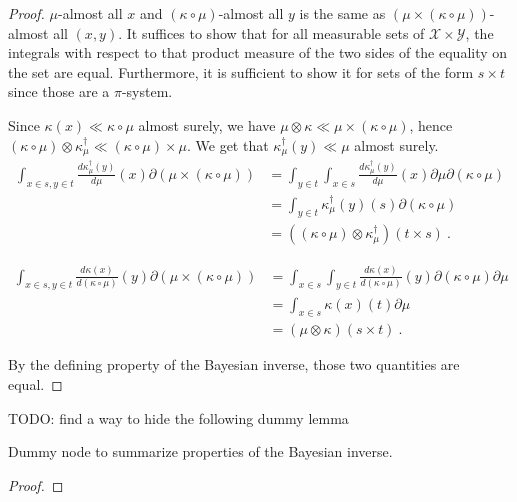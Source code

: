 \begin{proof}%
\uses{}
$\mu$-almost all $x$ and $(\kappa \circ \mu)$-almost all $y$ is the same as $(\mu \times (\kappa \circ \mu))$-almost all $(x, y)$.
It suffices to show that for all measurable sets of $\mathcal X \times \mathcal Y$, the integrals with respect to that product measure of the two sides of the equality on the set are equal. Furthermore, it is sufficient to show it for sets of the form $s \times t$ since those are a $\pi$-system.

Since $\kappa(x) \ll \kappa \circ \mu$ almost surely, we have $\mu \otimes \kappa \ll \mu \times (\kappa \circ \mu)$, hence $(\kappa \circ \mu) \otimes \kappa_\mu^\dagger \ll (\kappa \circ \mu) \times \mu$.
We get that $\kappa_\mu^\dagger(y) \ll \mu$ almost surely.
\begin{align*}
\int_{x \in s, y \in t} \frac{d \kappa_\mu^\dagger(y)}{d \mu}(x) \partial (\mu \times (\kappa \circ \mu))
&= \int_{y \in t} \int_{x \in s} \frac{d \kappa_\mu^\dagger(y)}{d \mu}(x) \partial \mu \partial (\kappa \circ \mu)
\\
&= \int_{y \in t} \kappa_\mu^\dagger(y)(s) \partial (\kappa \circ \mu)
\\
&= ((\kappa \circ \mu) \otimes \kappa_\mu^\dagger) (t \times s)
\: .
\end{align*}

\begin{align*}
\int_{x \in s, y \in t} \frac{d \kappa(x)}{d(\kappa \circ \mu)}(y) \partial (\mu \times (\kappa \circ \mu))
&= \int_{x \in s} \int_{y \in t} \frac{d \kappa(x)}{d(\kappa \circ \mu)}(y) \partial (\kappa \circ \mu) \partial \mu
\\
&= \int_{x \in s} \kappa(x)(t) \partial \mu
\\
&= (\mu \otimes \kappa) (s \times t)
\: .
\end{align*}

By the defining property of the Bayesian inverse, those two quantities are equal.
\end{proof}



TODO: find a way to hide the following dummy lemma
\begin{lemma}
  \label{lem:bayesInv_properties}
  \leanok
  Dummy node to summarize properties of the Bayesian inverse.
\end{lemma}

\begin{proof}\leanok
{}
\end{proof}